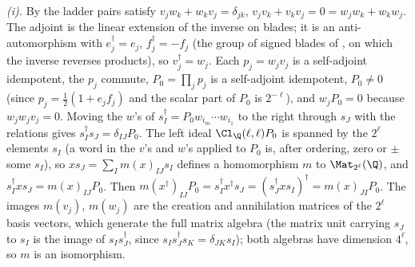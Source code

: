 \emph{(i).} By  the ladder pairs satisfy $v_{j}w_{k} + w_{k}v_{j} = \delta_{jk}$, $v_{j}v_{k} + v_{k}v_{j} = 0 = w_{j}w_{k} + w_{k}w_{j}$. The adjoint is the linear extension of the inverse on blades; it is an anti-automorphism with $e_{j}^{\dagger} = e_{j}$, $f_{j}^{\dagger} = -f_{j}$ (the group of signed blades of , on which the inverse reverses products), so $v_{j}^{\dagger} = w_{j}$. Each $p_{j} = w_{j}v_{j}$ is a self-adjoint idempotent, the $p_{j}$ commute, $P_{0} = \prod_{j}p_{j}$ is a self-adjoint idempotent, $P_{0} \ne 0$ (since $p_{j} = \tfrac12(1 + e_{j}f_{j})$ and the scalar part of $P_{0}$ is $2^{-\ell}$), and $w_{j}P_{0} = 0$ because $w_{j}w_{j}v_{j} = 0$. Moving the $w$'s of $s_{I}^{\dagger} = P_{0}w_{i_{m}}\cdots w_{i_{1}}$ to the right through $s_{J}$ with the relations gives $s_{I}^{\dagger}s_{J} = \delta_{IJ}P_{0}$. The left ideal $\Cl_{\Q}(\ell,\ell)P_{0}$ is spanned by the $2^{\ell}$ elements $s_{I}$ (a word in the $v$'s and $w$'s applied to $P_{0}$ is, after ordering, zero or $\pm$ some $s_{I}$), so $xs_{J} = \sum_{I}m(x)_{IJ}s_{I}$ defines a homomorphism $m$ to $\Mat_{2^{\ell}}(\Q)$, and $s_{I}^{\dagger}xs_{J} = m(x)_{IJ}P_{0}$. Then $m(x^{\dagger})_{IJ}P_{0} = s_{I}^{\dagger}x^{\dagger}s_{J} = (s_{J}^{\dagger}xs_{I})^{\dagger} = m(x)_{JI}P_{0}$. The images $m(v_{j})$, $m(w_{j})$ are the creation and annihilation matrices of the $2^{\ell}$ basis vectors, which generate the full matrix algebra (the matrix unit carrying $s_{J}$ to $s_{I}$ is the image of $s_{I}s_{J}^{\dagger}$, since $s_{I}s_{J}^{\dagger}s_{K} = \delta_{JK}s_{I}$); both algebras have dimension $4^{\ell}$, so $m$ is an isomorphism.

